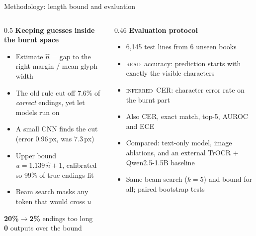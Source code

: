 \documentclass[aspectratio=169,11pt]{beamer}
\newcommand{\READ}{\textsc{read}}
\newcommand{\INF}{\textsc{inferred}}
\newcommand{\bignum}[1]{{\Large\bfseries\color{burn}#1}}
\begin{document}
\begin{frame}{Methodology: length bound and evaluation}
\footnotesize
\begin{columns}[T]
\begin{column}{0.5\textwidth}
\textbf{Keeping guesses inside the burnt space}
\begin{itemize}
\item Estimate $\hat n$ = gap to the right margin / mean glyph width
\item The old rule cut off 7.6\% of \emph{correct} endings, yet let models run on
\item A small CNN finds the cut (error 0.96\,px, was 7.3\,px)
\item Upper bound $u = 1.139\,\hat n + 1$, calibrated so 99\% of true endings fit
\item Beam search masks any token that would cross $u$
\end{itemize}
\vspace{0.3em}
\bignum{20\%$\rightarrow$2\%} endings too long\\
\bignum{0} outputs over the bound
\end{column}
\begin{column}{0.46\textwidth}
\textbf{Evaluation protocol}
\begin{itemize}
\item 6{,}145 test lines from 6 unseen books
\item \READ\ accuracy: prediction starts with exactly the visible characters
\item \INF\ CER: character error rate on the burnt part
\item Also CER, exact match, top-5, AUROC and ECE
\item Compared: text-only model, image ablations, and an external TrOCR + Qwen2.5-1.5B baseline
\item Same beam search ($k=5$) and bound for all; paired bootstrap tests
\end{itemize}
\end{column}
\end{columns}
\end{frame}
\end{document}
